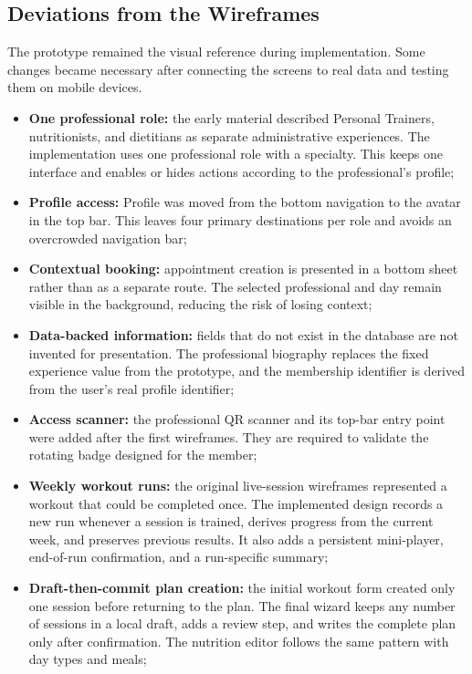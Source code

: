 \subsection{Deviations from the Wireframes}\label{subsect:Deviations}

The prototype remained the visual reference during implementation. Some changes became necessary after connecting the screens to real data and testing them on mobile devices.

\begin{itemize}
    \item \textbf{One professional role:} the early material described Personal Trainers, nutritionists, and dietitians as separate administrative experiences. The implementation uses one professional role with a specialty. This keeps one interface and enables or hides actions according to the professional's profile;
    \item \textbf{Profile access:} Profile was moved from the bottom navigation to the avatar in the top bar. This leaves four primary destinations per role and avoids an overcrowded navigation bar;
    \item \textbf{Contextual booking:} appointment creation is presented in a bottom sheet rather than as a separate route. The selected professional and day remain visible in the background, reducing the risk of losing context;
    \item \textbf{Data-backed information:} fields that do not exist in the database are not invented for presentation. The professional biography replaces the fixed experience value from the prototype, and the membership identifier is derived from the user's real profile identifier;
    \item \textbf{Access scanner:} the professional QR scanner and its top-bar entry point were added after the first wireframes. They are required to validate the rotating badge designed for the member;
    \item \textbf{Weekly workout runs:} the original live-session wireframes represented a workout that could be completed once. The implemented design records a new run whenever a session is trained, derives progress from the current week, and preserves previous results. It also adds a persistent mini-player, end-of-run confirmation, and a run-specific summary;
    \item \textbf{Draft-then-commit plan creation:} the initial workout form created only one session before returning to the plan. The final wizard keeps any number of sessions in a local draft, adds a review step, and writes the complete plan only after confirmation. The nutrition editor follows the same pattern with day types and meals;

\end{itemize}
